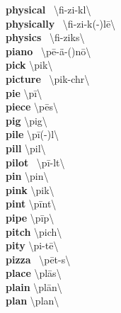 \documentclass[10pt,a4paper]{article}
\begin{document}
\begin{multicols}{2}
\textbf{ physical }\quad \ \textbackslash \textprimstress fi-zi-k\textschwa l\textbackslash \\
\textbf{ physically }\quad \ \textbackslash \textprimstress fi-zi-k(\textschwa -)l\={e}\textbackslash \\
\textbf{ physics }\quad \ \textbackslash \textprimstress fi-ziks\textbackslash \\
\textbf{ piano }\quad \ \textbackslash p\={e}-\textprimstress \"{a}-(\textsecstress )n\={o}\textbackslash \\
\textbf{ pick }\quad \textbackslash \textprimstress pik\textbackslash \\
\textbf{ picture }\quad \ \textbackslash \textprimstress pik-ch\textschwa r\textbackslash \\
\textbf{ pie }\quad \textbackslash \textprimstress p\={i}\textbackslash \\
\textbf{ piece }\quad \textbackslash \textprimstress p\={e}s\textbackslash \\
\textbf{ pig }\quad \textbackslash \textprimstress pig\textbackslash \\
\textbf{ pile }\quad \textbackslash \textprimstress p\={i}(-\textschwa )l\textbackslash \\
\textbf{ pill }\quad \textbackslash \textprimstress pil\textbackslash \\
\textbf{ pilot }\quad \ \textbackslash \textprimstress p\={i}-l\textschwa t\textbackslash \\
\textbf{ pin }\quad \textbackslash \textprimstress pin\textbackslash \\
\textbf{ pink }\quad \textbackslash \textprimstress pi\engma k\textbackslash \\
\textbf{ pint }\quad \textbackslash \textprimstress p\={i}nt\textbackslash \\
\textbf{ pipe }\quad \textbackslash \textprimstress p\={i}p\textbackslash \\
\textbf{ pitch }\quad \textbackslash \textprimstress pich\textbackslash \\
\textbf{ pity }\quad \textbackslash \textprimstress pi-t\={e}\textbackslash \\
\textbf{ pizza }\quad \ \textbackslash \textprimstress p\={e}t-s\textschwa \textbackslash \\
\textbf{ place }\quad \textbackslash \textprimstress pl\={a}s\textbackslash \\
\textbf{ plain }\quad \textbackslash \textprimstress pl\={a}n\textbackslash \\
\textbf{ plan }\quad \textbackslash \textprimstress plan\textbackslash \\

\end{multicols}
\end{document}
